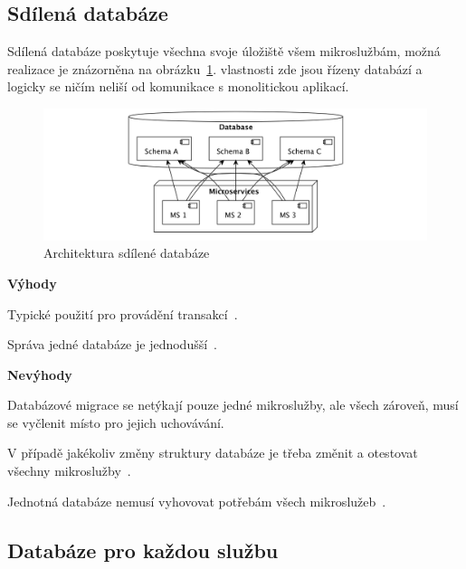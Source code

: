 \subsection{Sdílená databáze}\label{subsec:shared-db}

Sdílená databáze poskytuje všechna svoje úložiště všem mikroslužbám, možná realizace je znázorněna na obrázku~\ref{fig:db-shared}.  vlastnosti zde jsou řízeny databází a logicky se ničím neliší od komunikace s monolitickou aplikací.

\begin{figure}[htbp]
   \centering
   \includegraphics[max width=\textwidth]{assets/db-shared}
   \caption{Architektura sdílené databáze}\label{fig:db-shared}
\end{figure}

\textbf{Výhody}
\begin{ul}
   \item Typické použití  pro provádění transakcí~\cite{shareddb}.
   \item Správa jedné databáze je jednodušší~\cite{shareddb}.
\end{ul}

\textbf{Nevýhody}
\begin{ul}
   \item Databázové migrace se netýkají pouze jedné mikroslužby, ale všech zároveň, musí se vyčlenit místo pro jejich uchovávání.
   \item V případě jakékoliv změny struktury databáze je třeba změnit a otestovat všechny mikroslužby~\cite{shareddb}.
   \item Jednotná databáze nemusí vyhovovat potřebám všech mikroslužeb~\cite{shareddb}.
\end{ul}



\subsection{Databáze pro každou službu}\label{subsec:msa-db-per-service}

